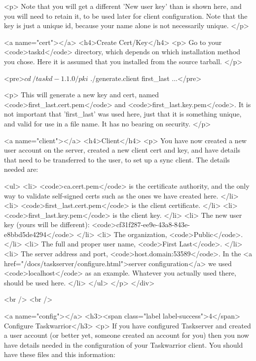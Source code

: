 \documentclass[t,handout]{beamer}
\begin{document}
<p>
  Note that you will get a different 'New user key' than is shown
  here, and you will need to retain it, to be used later for client
  configuration.  Note that the key is just a unique id, because
  your name alone is not necessarily unique.
</p>

<a name="cert"></a>
<h4>Create Cert/Key</h4>
<p>
  Go to your <code>taskd</code> directory, which depends on
  which installation method you chose. Here it is assumed that
  you installed from the source tarball.
</p>

<pre>$ cd ~/taskd-1.1.0/pki
$ ./generate.client first_last
...</pre>

<p>
  This will generate a new key and cert, named
  <code>first_last.cert.pem</code>
  and
  <code>first_last.key.pem</code>.
  It is not important that 'first_last' was used here, just that it
  is something unique, and valid for use in a file name. It has no
  bearing on security.
</p>

<a name="client"></a>
<h4>Client</h4>
<p>
  You have now created a new user account on the server, created a
  new client cert and key, and have details that need to be
  transferred to the user, to set up a sync client.  The details
  needed are:

  <ul>
    <li>
      <code>ca.cert.pem</code> is the certificate authority, and
      the only way to validate self-signed certs such as the ones
      we have created here.
    </li>
    <li>
      <code>first_last.cert.pem</code> is the client certificate.
    </li>
    <li>
      <code>first_last.key.pem</code> is the client key.
    </li>
    <li>
      The new user key (yours will be different):
      <code>cf31f287-ee9e-43a8-843e-e8bbd5de4294</code>
    </li>
    <li>
      The organization, <code>Public</code>.
    </li>
    <li>
      The full and proper user name, <code>First Last</code>.
    </li>
    <li>
      The server address and port, <code>host.domain:53589</code>.
      In the
      <a href="/docs/taskserver/configure.html">server configuration</a>
      we used <code>localhost</code> as an example. Whatever you
      actually used there, should be used here.
    </li>
  </ul>
</p>
</div>

<br />
<br />


<a name="config"></a>
<h3><span class="label label-success">4</span> Configure Taskwarrior</h3>
<p>
  If you have configured Taskserver and created a user account (or
  better yet, someone created an account for you) then you now have
  details needed in the configuration of your Taskwarrior client.
  You should have these files and this information:
\end{document}
